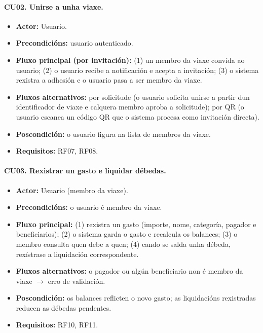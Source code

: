 \paragraph*{CU02. Unirse a unha viaxe.}
\begin{itemize}[noitemsep,topsep=2pt]
  \item \textbf{Actor:} Usuario.
  \item \textbf{Precondicións:} usuario autenticado.
  \item \textbf{Fluxo principal (por invitación):} (1) un membro da viaxe convída ao usuario; (2) o usuario recibe a notificación e acepta a invitación; (3) o sistema rexistra a adhesión e o usuario pasa a ser membro da viaxe.
  \item \textbf{Fluxos alternativos:} por solicitude (o usuario solicita unirse a partir dun identificador de viaxe e calquera membro aproba a solicitude); por QR (o usuario escanea un código QR que o sistema procesa como invitación directa).
  \item \textbf{Poscondición:} o usuario figura na lista de membros da viaxe.
  \item \textbf{Requisitos:} RF07, RF08.
\end{itemize}

\paragraph*{CU03. Rexistrar un gasto e liquidar débedas.}
\begin{itemize}[noitemsep,topsep=2pt]
  \item \textbf{Actor:} Usuario (membro da viaxe).
  \item \textbf{Precondicións:} o usuario é membro da viaxe.
  \item \textbf{Fluxo principal:} (1) rexistra un gasto (importe, nome, categoría, pagador e beneficiarios); (2) o sistema garda o gasto e recalcula os balances; (3) o membro consulta quen debe a quen; (4) cando se salda unha débeda, rexístrase a liquidación correspondente.
  \item \textbf{Fluxos alternativos:} o pagador ou algún beneficiario non é membro da viaxe $\rightarrow$ erro de validación.
  \item \textbf{Poscondición:} os balances reflicten o novo gasto; as liquidacións rexistradas reducen as débedas pendentes.
  \item \textbf{Requisitos:} RF10, RF11.
\end{itemize}

